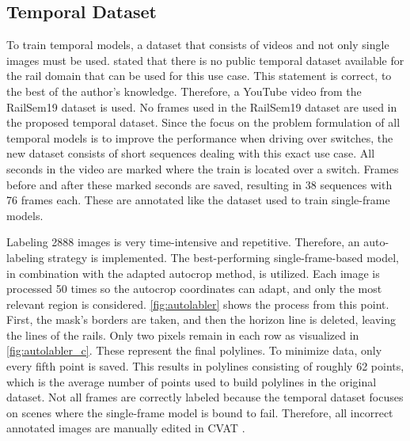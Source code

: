 \subsection{Temporal Dataset}
\label{sec:tempDataset}

To train temporal models, a dataset that consists of videos and not only single images must be used.
\cite{tepNet2024} stated that there is no public temporal dataset available for the rail domain that can be used for this use case.
This statement is correct, to the best of the author's knowledge.
Therefore, a YouTube video \cite{temporalDataset_youtube_video} from the RailSem19 dataset is used.
No frames used in the RailSem19 dataset are used in the proposed temporal dataset.
Since the focus on the problem formulation of all temporal models is to improve the performance when driving over switches, the new dataset consists of short sequences dealing with this exact use case.
All seconds in the video \cite{temporalDataset_youtube_video} are marked where the train is located over a switch.
Frames before and after these marked seconds are saved, resulting in 38 sequences with 76 frames each. These are annotated like the dataset used to train single-frame models.

Labeling 2888 images is very time-intensive and repetitive.
Therefore, an auto-labeling strategy is implemented.
The best-performing single-frame-based model, in combination with the adapted autocrop method, is utilized.
Each image is processed 50 times so the autocrop coordinates can adapt, and only the most relevant region is considered.
\autoref{fig:autolabler} shows the process from this point.
First, the mask's borders are taken, and then the horizon line is deleted, leaving the lines of the rails.
Only two pixels remain in each row as visualized in \autoref{fig:autolabler_c}.
These represent the final polylines. To minimize data, only every fifth point is saved.
This results in polylines consisting of roughly 62 points, which is the average number of points used to build polylines in the original dataset.
Not all frames are correctly labeled because the temporal dataset focuses on scenes where the single-frame model is bound to fail.
Therefore, all incorrect annotated images are manually edited in CVAT \cite{cvat}.

